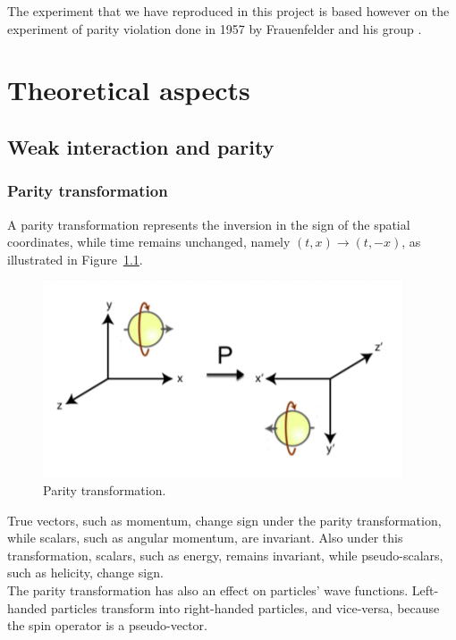\documentclass[10pt,swedish, openany]{book}
\begin{document}
The experiment that we have reproduced in this project is based however on the experiment of parity violation done in 1957 by Frauenfelder and his group \cite{paritos}.

\chapter{Theoretical aspects}

\section{Weak interaction and parity}
\subsection{Parity transformation}
A parity transformation represents the inversion in the sign of the spatial coordinates, while time remains unchanged, namely $(t,x) \rightarrow (t,-x)$, as illustrated in Figure~\ref{fig:parity}.
\begin{figure}[h]
\includegraphics[scale=1]{parity.png}
\centering
\caption{Parity transformation.}
\label{fig:parity}
\end{figure}

True vectors, such as momentum, change sign under the parity transformation, while scalars, such as angular momentum, are invariant. Also under this transformation, scalars, such as energy, remains invariant, while pseudo-scalars, such as helicity, change sign.\\

The parity transformation has also an effect on particles' wave functions. Left-handed particles transform into right-handed particles, and vice-versa, because the spin operator is a pseudo-vector.\\
\end{document}

